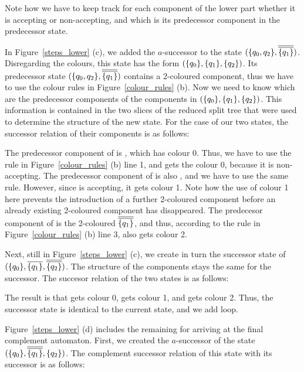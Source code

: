 Note how we have to keep track for each component of the lower part whether it is accepting or non-accepting, and which is its predecessor component in the predecessor state. 

In Figure~\ref{steps_lower} (c), we added the $a$-successor to the state $(\qqm02, \cl2{\qm1})$. Disregarding the colours, this state has the form $(\{q_{0}\}, \{q_{1}\}, \{q_{2}\})$. Its predecessor state $(\qqm02, \cl2{\qm1})$ contains a 2-coloured component, thus we have to use the colour rules in Figure~\ref{colour_rules} (b). Now we need to know which are the predecessor components of the components in $(\{q_{0}\}, \{q_{1}\}, \{q_{2}\})$. This information is contained in the two slices of the reduced split tree that were used to determine the structure of the new state. For the case of our two states, the successor relation of their components is as follows:

\begin{center}
\PredCompsOne
\end{center}

The predecessor component of  is , which has colour 0. Thus, we have to use the rule in Figure~\ref{colour_rules} (b) line 1, and  gets the colour 0, because it is non-accepting. The predecessor component of  is also , and we have to use the same rule. However, since  is accepting, it gets colour 1. Note how the use of colour 1 here prevents the introduction of a further 2-coloured component before an already existing 2-coloured component has disappeared. The predecesor component of  is the 2-coloured $\cl2{\qm1}$, and thus, according to the rule in Figure~\ref{colour_rules} (b) line 3,  also gets colour 2.

Next, still in Figure~\ref{steps_lower} (c), we create in turn the successor state of $(\qm0, \cl1{\qm1}, \cl2{\qm2})$. The structure of the components stays the same for the successor. The succesor relation of the two states is as follows:

\begin{center}
\PredCompsTwo
\end{center}

The result is that  gets colour 0,  gets colour 1, and  gets colour 2. Thus, the successor state is identical to the current state, and we add loop.

Figure~\ref{steps_lower} (d) includes the remaining for arriving at the final complement automaton. First, we created the $a$-successor of the state $(\qm0, \cl2{\qm1}, \qm2)$. The complement successor relation of this state with its successor is as follows:

